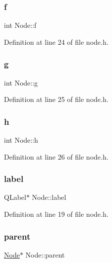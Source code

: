 \subsubsection{\texorpdfstring{f}{f}}
{\footnotesize\ttfamily int Node\+::f}



Definition at line 24 of file node.\+h.

\mbox{\label{class_node_a0b249888eacdec6c623ec8c58b230c48}} 
\subsubsection{\texorpdfstring{g}{g}}
{\footnotesize\ttfamily int Node\+::g}



Definition at line 25 of file node.\+h.

\mbox{\label{class_node_afb5a7ac7536a9e09488bb685420cd78a}} 
\subsubsection{\texorpdfstring{h}{h}}
{\footnotesize\ttfamily int Node\+::h}



Definition at line 26 of file node.\+h.

\mbox{\label{class_node_a95d9b57b8efb3807c994314c3ff444b7}} 
\subsubsection{\texorpdfstring{label}{label}}
{\footnotesize\ttfamily Q\+Label$\ast$ Node\+::label}



Definition at line 19 of file node.\+h.

\mbox{\label{class_node_ad8184598cdea70e4bbdfd76f2b0f9e85}} 
\subsubsection{\texorpdfstring{parent}{parent}}
{\footnotesize\ttfamily \hyperlink{class_node}{Node}$\ast$ Node\+::parent}



